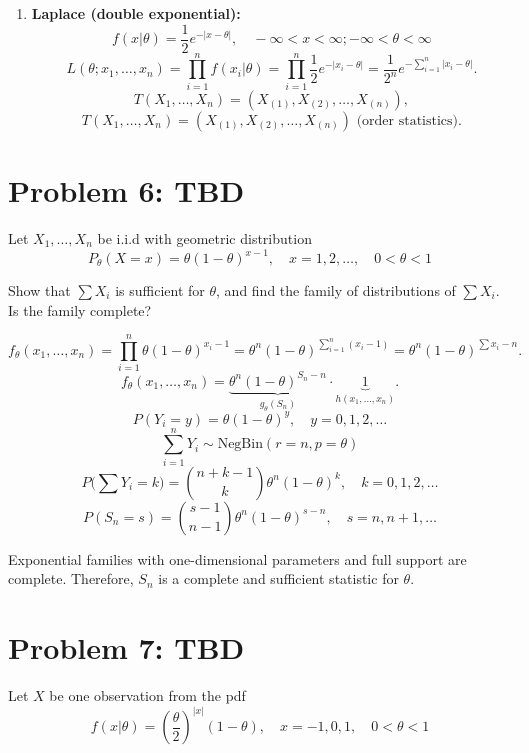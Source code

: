 \documentclass{article}
\begin{document}
\begin{enumerate}
	\item \textbf{Laplace (double exponential):}
	      $$f(x|\theta) = \frac{1}{2}e^{-|x-\theta|}, \quad - \infty<x<\infty; - \infty<\theta<\infty$$
	      \[
		      L(\theta; x_1, \dots, x_n) = \prod_{i=1}^{n} f(x_i|\theta)
		      = \prod_{i=1}^{n} \frac{1}{2} e^{-|x_i-\theta|}
		      = \frac{1}{2^n} e^{-\sum_{i=1}^{n} |x_i - \theta|}.
	      \]
	      \[
		      T(X_1, \dots, X_n) = (X_{(1)}, X_{(2)}, \dots, X_{(n)}),
	      \]
	      \[
		      \boxed{T(X_1, \dots, X_n) = (X_{(1)}, X_{(2)}, \dots, X_{(n)}) \text{ (order statistics)}}.
	      \]

\end{enumerate}


\section*{Problem 6: TBD}

Let $X_1, \ldots, X_n$ be i.i.d with geometric distribution
$$
	P_\theta(X=x) = \theta(1-\theta)^{x-1}, \quad x=1,2,\ldots, \quad 0 < \theta < 1
$$

Show that $\sum X_i$ is sufficient for $\theta$, and find the family of distributions of $\sum X_i$. Is the
family complete?

\[
	f_\theta(x_1, \dots, x_n) = \prod_{i=1}^n \theta (1-\theta)^{x_i - 1}
	= \theta^n (1-\theta)^{\sum_{i=1}^n (x_i - 1)}
	= \theta^n (1-\theta)^{\sum x_i - n}.
\]
\[
	f_\theta(x_1, \dots, x_n) = \underbrace{\theta^n (1-\theta)^{S_n - n}}_{g_\theta(S_n)} \cdot \underbrace{1}_{h(x_1,\dots,x_n)}.
\]
\[
	P(Y_i = y) = \theta (1-\theta)^y, \quad y = 0,1,2,\dots
\]
\[
	\sum_{i=1}^n Y_i \sim \text{NegBin}(r=n, p=\theta)
\]
\[
	P\Big(\sum Y_i = k\Big) = \binom{n+k-1}{k} \theta^n (1-\theta)^k, \quad k=0,1,2,\dots
\]
\[
	\boxed{
		P(S_n = s) = \binom{s-1}{n-1} \theta^n (1-\theta)^{s-n}, \quad s=n,n+1,\dots
	}
\]

Exponential families with one-dimensional parameters and full support are complete. Therefore, $S_n$ is a complete and sufficient statistic for $\theta$.

\section*{Problem 7: TBD}
Let $X$ be one observation from the pdf
$$
	f(x|\theta) = \left(\frac{\theta}{2}\right)^{|x|}(1-\theta), \quad x= -1,0,1, \quad 0<\theta<1
$$
\end{document}
